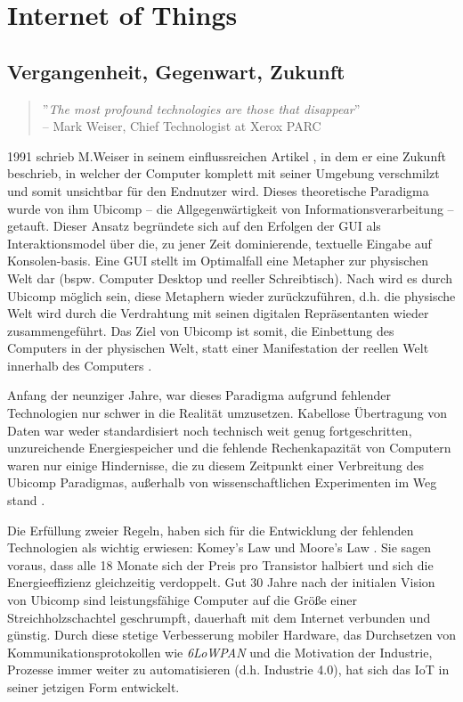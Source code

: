 \section{Internet of Things}
\subsection{Vergangenheit, Gegenwart, Zukunft}
\begin{quote}
''\textit{The most profound technologies are those that disappear}'' \\-- Mark Weiser, Chief Technologist at Xerox PARC
\end{quote}

1991 schrieb M.Weiser in seinem einflussreichen Artikel \cite{weiser1991computer}, in dem er eine Zukunft beschrieb, in welcher der Computer komplett mit seiner Umgebung verschmilzt und somit unsichtbar für den Endnutzer wird. Dieses theoretische Paradigma wurde von ihm \ac{Ubicomp} -- die Allgegenwärtigkeit von Informationsverarbeitung -- getauft. Dieser Ansatz begründete sich auf den Erfolgen der \ac{GUI} als Interaktionsmodel über die, zu jener Zeit dominierende, textuelle Eingabe auf Konsolen-basis. Eine \ac{GUI} stellt im Optimalfall eine Metapher zur physischen Welt dar (bspw. Computer Desktop und reeller Schreibtisch). Nach \cite{weiser1991computer} wird es durch \ac{Ubicomp} möglich sein, diese Metaphern wieder zurückzuführen, d.h. die physische Welt wird durch die Verdrahtung mit seinen digitalen Repräsentanten wieder zusammengeführt. Das Ziel von \ac{Ubicomp} ist somit, die Einbettung des Computers in der physischen Welt, statt einer Manifestation der reellen Welt innerhalb des Computers \cite{lyytinen2002ubiquitous}. 

Anfang der neunziger Jahre, war dieses Paradigma aufgrund fehlender Technologien nur schwer in die Realität umzusetzen. Kabellose Übertragung von Daten war weder standardisiert noch technisch weit genug fortgeschritten, unzureichende Energiespeicher und die fehlende Rechenkapazität von Computern waren nur einige Hindernisse, die zu diesem Zeitpunkt einer Verbreitung des \ac{Ubicomp} Paradigmas, außerhalb von wissenschaftlichen Experimenten im Weg stand \cite{lyytinen2002ubiquitous}.

Die Erfüllung zweier Regeln, haben sich für die Entwicklung der fehlenden Technologien als wichtig erwiesen: Komey's Law \cite{koomey2010law} und Moore's Law \cite{schaller1997moore}. Sie sagen voraus, dass alle 18 Monate sich der Preis pro Transistor halbiert und sich die Energieeffizienz gleichzeitig verdoppelt. Gut 30 Jahre nach der initialen Vision von \ac{Ubicomp} sind leistungsfähige Computer auf die Größe einer Streichholzschachtel geschrumpft, dauerhaft mit dem Internet verbunden und günstig. Durch diese stetige Verbesserung mobiler Hardware, das Durchsetzen von Kommunikationsprotokollen wie \textit{6LoWPAN} und die Motivation der Industrie, Prozesse immer weiter zu automatisieren (d.h. Industrie 4.0), hat sich das \acf{IoT} in seiner jetzigen Form entwickelt.

